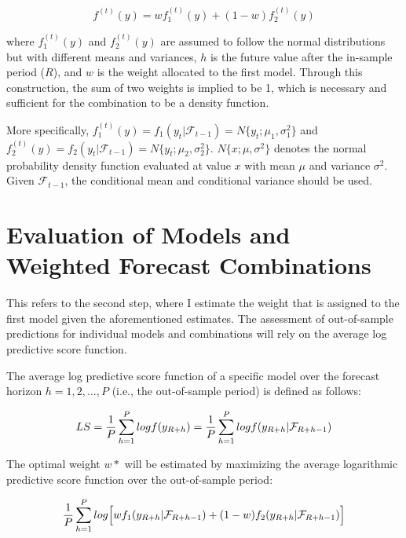 \documentclass{monashthesis}
\begin{document}
\begin{equation}
f^{(t)}(y) = wf^{(t)}_1(y) + (1-w)f^{(t)}_2(y)
\end{equation}

where \(f^{(t)}_1(y)\) and \(f^{(t)}_2(y)\) are assumed to follow the normal distributions but with different means and variances, \(h\) is the future value after the in-sample period (\(R\)), and \(w\) is the weight allocated to the first model. Through this construction, the sum of two weights is implied to be 1, which is necessary and sufficient for the combination to be a density function\autocite{GA11}.

More specifically, \(f^{(t)}_1(y)=f_1(y_t|\mathcal{F}_{t-1})=N\{y_t; \mu_1, \sigma^2_1\}\) and \(f^{(t)}_2(y)=f_2(y_t|\mathcal{F}_{t-1})=N\{y_t; \mu_2, \sigma^2_2\}\). \(N\{x; \mu, \sigma^2\}\) denotes the normal probability density function evaluated at value \(x\) with mean \(\mu\) and variance \(\sigma^2\). Given \(\mathcal{F}_{t-1}\), the conditional mean and conditional variance should be used.

\hypertarget{evaluation}{%
\section{Evaluation of Models and Weighted Forecast Combinations}\label{evaluation}}

This refers to the second step, where I estimate the weight that is assigned to the first model given the aforementioned estimates. The assessment of out-of-sample predictions for individual models and combinations will rely on the average log predictive score function.

The average log predictive score function of a specific model over the forecast horizon \(h=1,2,...,P\) (i.e., the out-of-sample period) is defined as follows:

\begin{equation}
LS = \frac{1}{P}\sum^P_{h=1}logf(y_{\small{R+h}}) = \frac{1}{P}\sum^P_{h=1} logf(y_{\small{R+h}}| \mathcal{F}_{\small{R+h-1}})
\end{equation}

The optimal weight \(w*\) will be estimated by maximizing the average logarithmic predictive score function over the out-of-sample period:

\begin{equation}
\frac{1}{P}\sum^P_{h=1}log\Big[wf_1(y_{\small{R+h}}|\mathcal{F}_{\small{R+h-1}}) + (1-w)f_2(y_{\small{R+h}}|\mathcal{F}_{\small{R+h-1}})\Big]
\end{equation}
\end{document}

